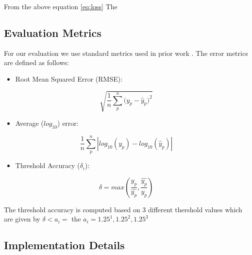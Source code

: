 From the above equation \ref{eq:loss} The 

\subsection{Evaluation Metrics}
For our evaluation we use standard metrics used in prior work \cite{Alhashim2018, eigen2014depth}. The error metrics are defined as follows:
\begin{itemize}
    
    \item Root Mean Squared Error (RMSE):
    
\end{itemize}{}

\begin{equation} \label{RMSE}
        \sqrt{\frac{1}{n} \sum_{p}^{n}{(y_{p} - \hat{y}_{p}})^2}
\end{equation}

\begin{itemize}

    \item Average (${log_{10}}$) error: 
    
\end{itemize}{}

\begin{equation} \label{avg_log}
    \frac{1}{n} \sum_{p}^{n} \left|log_{10}(y_{p}) - log_{10}(\hat{y}_{p}) \right|
\end{equation}


\begin{itemize}
    \item Threshold Accuracy (\(\delta_{i}\)): 
\end{itemize}{}

\begin{equation} \label{ThresholdAcc}
    {\delta = max (\frac{{y_{p}}}{\hat{y_{p}}}, \frac{\hat{y_{p}}}{{y_{p}}})}
\end{equation}

The threshold accuracy is computed based on 3 different thershold values which are given by \(\delta < a_{i}=\) the \(a_{i}= 1.25^1, 1.25^2, 1.25^3\)  






\subsection{Implementation Details}
\label{Chapter5:HardwarSoftwareDetails}


